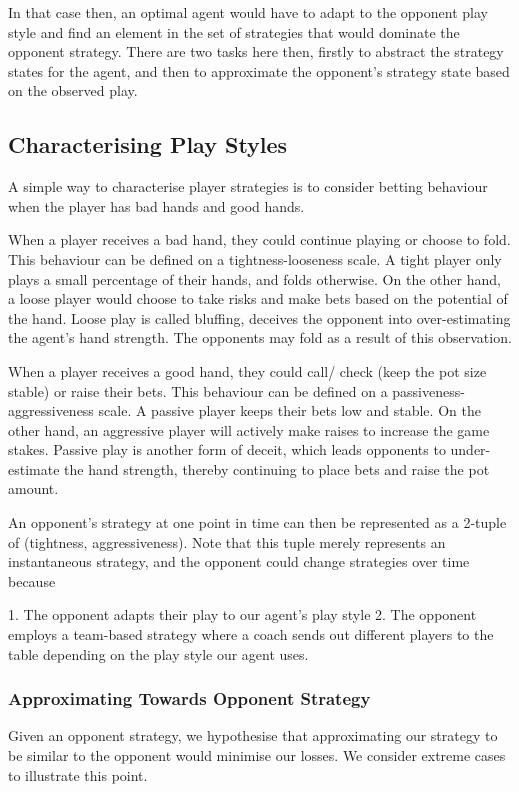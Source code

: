 \documentclass{article}
\begin{document}
In that case then, an optimal agent would have to adapt to the opponent play style and find an element in the set of strategies that would dominate the opponent strategy.  There are two tasks here then, firstly to abstract the strategy states for the agent, and then to approximate the opponent's strategy state based on the observed play.

\subsection{Characterising Play Styles}
A simple way to characterise player strategies is to consider betting behaviour when the player has bad hands and good hands. 

When a player receives a bad hand, they could continue playing or choose to fold. This behaviour can be defined on a tightness-looseness scale. A tight player only plays a small percentage of their hands, and folds otherwise. On the other hand, a loose player would choose to take risks and make bets based on the potential of the hand. Loose play is called bluffing, deceives the opponent into over-estimating the agent's hand strength. The opponents may fold as a result of this observation.

When a player receives a good hand, they could call/ check (keep the pot size stable) or raise their bets. This behaviour can be defined on a passiveness-aggressiveness scale. A passive player keeps their bets low and stable. On the other hand, an aggressive player will actively make raises to increase the game stakes. Passive play is another form of deceit, which leads opponents to under-estimate the hand strength, thereby continuing to place bets and raise the pot amount.

An opponent's strategy at one point in time can then be represented as a 2-tuple of (tightness, aggressiveness). Note that this tuple merely represents an instantaneous strategy, and the opponent could change strategies over time because

1. The opponent adapts their play to our agent's play style
2. The opponent employs a team-based strategy where a coach sends out different players to the table depending on the play style our agent uses.

\subsubsection{Approximating Towards Opponent Strategy}

Given an opponent strategy, we hypothesise that approximating our strategy to be similar to the opponent would minimise our losses. We consider extreme cases to illustrate this point. 
\end{document}
